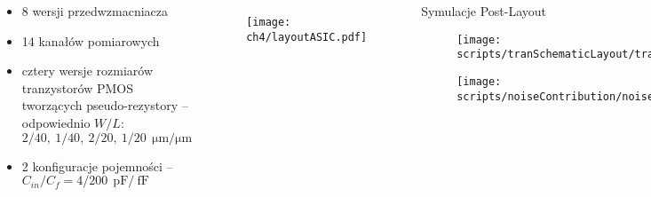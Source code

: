 \begin{frame}{}
    \begin{columns}

    \begin{block}{}
        \begin{itemize}
            \item 8 wersji przedwzmacniacza
            \item 14 kanałów pomiarowych
            \item cztery wersje rozmiarów tranzystorów PMOS tworzących pseudo-rezystory  -- odpowiednio $W/L$: $2/40,\ 1/40,\ 2/20,\ 1/20\ \SI{}{\micro\metre / \micro\metre}$
            \item 2 konfiguracje pojemności -- $C_{in}/C_f = 4/200\ \SI{}{\pico\farad}/\SI{}{\femto\farad}$
        \end{itemize}
    \end{block}

\vspace{-2em}
    \begin{figure}[H]
        \centering
        \texttt{[image: ch4/layoutASIC.pdf]} 
    \end{figure}   

    \begin{block}{
Symulacje Post-Layout
    }

    \begin{figure}[H]
        \centering
        \texttt{[image: scripts/tranSchematicLayout/tranSchematicLayout.pdf]}  
    \end{figure}
    \vspace{-5mm} %
    \begin{figure}[H]
        \centering
        \texttt{[image: scripts/noiseContribution/noiseContributionOut.pdf]}  
    \end{figure}
    \end{block}
    \end{columns}   
  
\end{frame}



